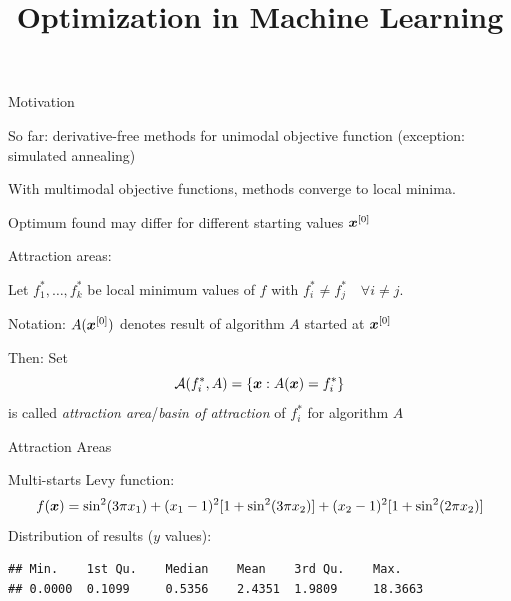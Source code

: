 \documentclass[11pt,compress,t,notes=noshow, xcolor=table]{beamer}
\title{Optimization in Machine Learning}
\begin{document}

\begin{framei}{Motivation}
\item So far: derivative-free methods for unimodal objective function (exception: simulated annealing)
\item With multimodal objective functions, methods converge to local minima.
\item Optimum found may differ for different starting values $\bm{x}^{[0]}$
\item Attraction areas:
\item Let $f_1^*, \ldots, f_k^*$ be local minimum values of $f$ with $f_i^* \neq f_j^* \quad \forall i \neq j$.
\item Notation: $A(\bm{x}^{[0]})$ denotes result of algorithm $A$ started at $\bm{x}^{[0]}$
\item Then: Set
$$\mathcal{A}(f_i^*, A) = \left\{ \bm{x} : A(\bm{x}) = f_i^*\right\}$$
is called \textit{attraction area}/\textit{basin of attraction} of $f_i^*$ for algorithm $A$
\end{framei}


\begin{framev}{Attraction Areas}
\end{framev}


\begin{vbframe}{Multi-starts}
Levy function:
$$f(\bm{x}) = \sin^2(3\pi x_1) + (x_1 - 1)^2 [1 + \sin^2(3\pi x_2)] + (x_2 -1)^2[1 + \sin^2(2\pi x_2)]$$
Distribution of results ($y$ values):
\begin{verbatim}
## Min.    1st Qu.    Median    Mean    3rd Qu.    Max.
## 0.0000  0.1099     0.5356    2.4351  1.9809     18.3663
\end{verbatim}
\end{vbframe}
\end{document}
